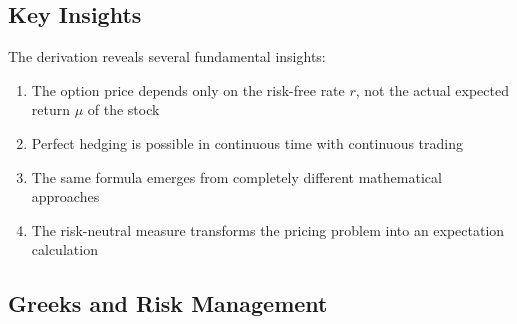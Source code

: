 \documentclass[
  letterpaper,
  DIV=11,
  numbers=noendperiod]{scrartcl}
\providecommand{\tightlist}{%
  \setlength{\itemsep}{0pt}\setlength{\parskip}{0pt}}\usepackage{longtable,booktabs,array}
\begin{document}
\hypertarget{key-insights}{%
\subsection{Key Insights}\label{key-insights}}

\begin{tcolorbox}[enhanced jigsaw, colback=white, rightrule=.15mm, coltitle=black, left=2mm, colframe=quarto-callout-tip-color-frame, breakable, arc=.35mm, bottomtitle=1mm, toptitle=1mm, titlerule=0mm, leftrule=.75mm, colbacktitle=quarto-callout-tip-color!10!white, title={Remark 5.2 (Key Insights)}, toprule=.15mm, opacitybacktitle=0.6, bottomrule=.15mm, opacityback=0]

The derivation reveals several fundamental insights:

\begin{enumerate}
\def\labelenumi{\arabic{enumi}.}
\tightlist
\item
  The option price depends only on the risk-free rate \(r\), not the
  actual expected return \(\mu\) of the stock
\item
  Perfect hedging is possible in continuous time with continuous trading
\item
  The same formula emerges from completely different mathematical
  approaches
\item
  The risk-neutral measure transforms the pricing problem into an
  expectation calculation
\end{enumerate}

\end{tcolorbox}

\hypertarget{greeks-and-risk-management}{%
\subsection{Greeks and Risk
Management}\label{greeks-and-risk-management}}
\end{document}
